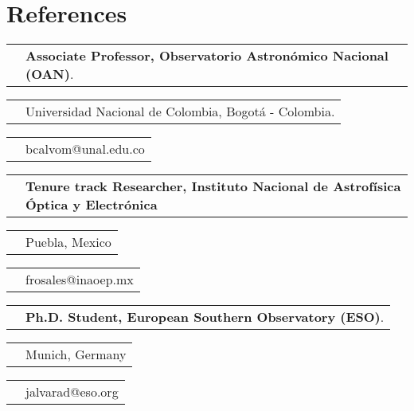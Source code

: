 \documentclass[11pt,letterpaper,sans]{moderncv}        %
\makeatletter
\renewcommand*{\cvitem}[3][.25em]{%
  \begin{tabular}{@{}p{\hintscolumnwidth}@{\hspace{\separatorcolumnwidth}}p{\maincolumnwidth}@{}}%
      \raggedleft\hintstyle{#2} &{#3}%
  \end{tabular}%
  \par\addvspace{#1}}
\makeatother
\begin{document}
\section{References}
\cvitem{\textbf{Benjam\'{i}n}}{\textbf{Associate Professor, Observatorio Astronómico Nacional (OAN)}.}
\cvitem{\textbf{Calvo-Mozo}}{Universidad Nacional de Colombia, Bogotá - Colombia.}
\cvitem{}{bcalvom@unal.edu.co}
\newpage
\cvitem{\textbf{Fabi\'an }}{\textbf{Tenure track Researcher, Instituto Nacional de Astrof\'{i}sica \'{O}ptica y Electr\'onica }}
\cvitem{\textbf{Rosales}}{Puebla, Mexico}
\cvitem{\textbf{Ortega}}{frosales@inaoep.mx}
\cvitem{\textbf{Julian David}}{\textbf{Ph.D. Student, European Southern Observatory (ESO)}.}
\cvitem{\textbf{Alvarado}}{Munich, Germany}
\cvitem{\textbf{G\'omez}}{jalvarad@eso.org }
\end{document}
